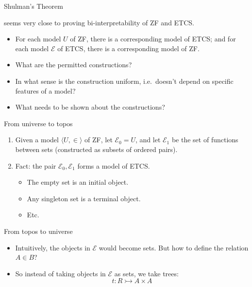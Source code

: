 \documentclass[ignorenonframetext,fleqn]{beamer}
\newcommand{\2}{\mathcal}
\begin{document}
\begin{frame}{Shulman's Theorem}



  \citet{shulman} seems very close to proving bi-interpretability of
  ZF and ETCS.

  \begin{itemize}
  \item For each model $U$ of ZF, there is a corresponding model of
    ETCS; and for each model $\2E$ of ETCS, there is a corresponding
    model of ZF.
  \item What are the permitted constructions?
  \item In what sense is the construction uniform, i.e.\ doesn't
    depend on specific features of a model?
  \item What needs to be shown about the constructions?
  \end{itemize}


\end{frame}

\begin{frame}{From universe to topos}

  \begin{enumerate}
  \item Given a model $\langle U,\in \rangle$ of ZF, let
    $\mathcal{E}_0=U$, and let $\mathcal{E}_1$ be the set of functions
    between sets (constructed as subsets of ordered pairs).
  \item Fact: the pair $\mathcal{E}_0,\mathcal{E}_1$ forms a model of
    ETCS.
    \begin{itemize}
    \item The empty set is an initial object.
    \item Any singleton set is a terminal object.
    \item Etc.
    \end{itemize}
  \end{enumerate}

\end{frame}

\begin{frame}{From topos to universe}

  \begin{itemize}
  \item Intuitively, the objects in $\2E$ would become sets. But how
    to define the relation $A\in B$?
  \item So instead of taking objects in $\2E$ as sets, we take trees: 
    \[ t:R \rightarrowtail A\times A \]
   \end{itemize}

\end{frame}
\end{document}
